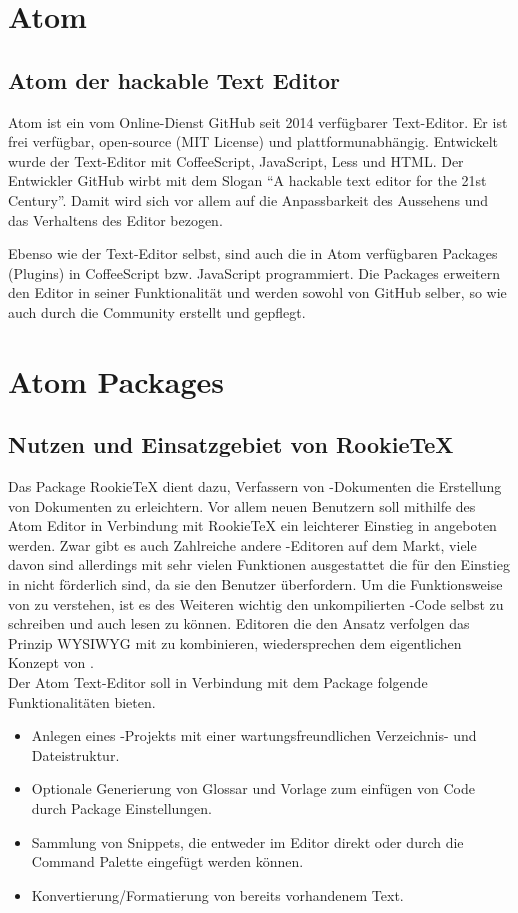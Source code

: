 \chapter{Atom}
    \section{Atom der hackable Text Editor}
    Atom ist ein vom Online-Dienst GitHub seit 2014 verfügbarer Text-Editor. Er ist frei verfügbar, open-source (MIT License) und plattformunabhängig. Entwickelt wurde der Text-Editor mit CoffeeScript, JavaScript, Less und HTML. Der Entwickler GitHub wirbt mit dem Slogan "`A hackable text editor for the 21st Century"'. Damit wird sich vor allem auf die Anpassbarkeit des Aussehens und das Verhaltens des Editor bezogen.

    Ebenso wie der Text-Editor selbst, sind auch die in Atom verfügbaren Packages (Plugins) in CoffeeScript bzw. JavaScript programmiert. Die Packages erweitern den Editor in seiner Funktionalität und werden sowohl von GitHub selber, so wie auch durch die Community erstellt und gepflegt.

\chapter{Atom Packages}
    \section{Nutzen und Einsatzgebiet von RookieTeX}
    Das Package RookieTeX dient dazu, Verfassern von \tex-Dokumenten die Erstellung von Dokumenten zu erleichtern. Vor allem neuen Benutzern soll mithilfe des Atom Editor in Verbindung mit RookieTeX ein leichterer Einstieg in \latex angeboten werden. Zwar gibt es auch Zahlreiche andere \latex-Editoren auf dem Markt, viele davon sind allerdings mit sehr vielen Funktionen ausgestattet die für den Einstieg in \tex nicht förderlich sind, da sie den Benutzer überfordern. Um die Funktionsweise von \latex zu verstehen, ist es des Weiteren wichtig den unkompilierten \latex-Code selbst zu schreiben und auch lesen zu können. Editoren die den Ansatz verfolgen das Prinzip WYSIWYG mit \latex zu kombinieren, wiedersprechen dem eigentlichen Konzept von \latex.
    \\
    Der Atom Text-Editor soll in Verbindung mit dem Package folgende Funktionalitäten bieten.
    \\[5mm]
    \begin{itemize}
        \item Anlegen eines \tex-Projekts mit einer wartungsfreundlichen Verzeichnis- und Dateistruktur.
        \item Optionale Generierung von Glossar und Vorlage zum einfügen von Code durch Package Einstellungen.
        \item Sammlung von Snippets, die entweder im Editor direkt oder durch die Command Palette eingefügt werden können.
        \item Konvertierung/Formatierung von bereits vorhandenem Text.
    \end{itemize}

